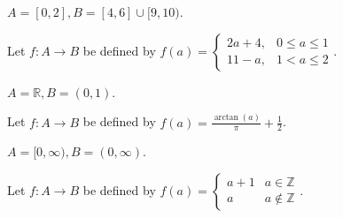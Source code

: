 \documentclass[12pt]{article}
\begin{document}
\newpage
{}

 $A = [0,2], B = [4,6] \cup [9,10)$.

Let $f:A \to B$ be defined by $f(a) = 
\begin{cases}
    2a + 4, & 0 \leq a \leq 1\\
    11 - a, & 1 < a \leq 2
\end{cases}$.

\bigskip
{} $A = \mathbb R, B = (0, 1)$.

Let $f:A \to B$ be defined by $f(a) = \frac{\arctan(a)}{\pi} + \frac12$.

\bigskip
{} $A = [0, \infty), B = (0, \infty)$.

Let $f:A \to B$ be defined by $f(a)=\begin{cases}
    a + 1 & a \in \mathbb Z \\
    a     & a \notin \mathbb Z
\end{cases}$.
\end{document}
